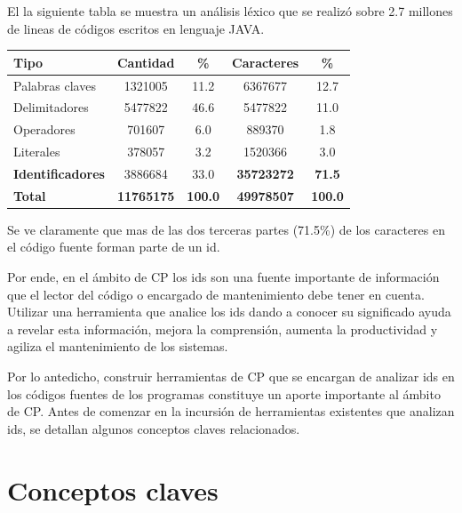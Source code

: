 \documentclass[a4paper,12pt]{report}
\begin{document}

El la siguiente tabla se muestra un análisis léxico que se realizó sobre 2.7 millones de lineas de códigos escritos en lenguaje JAVA.

\begin{center}
   \begin{tabular}{| l | c | c | c | c | }
     \hline
     \textsf{Tipo} & \textsf{Cantidad} & \textsf{\%} & \textsf{Caracteres} & \textsf{\%} \\ \hline
     Palabras claves & 1321005 & 11.2 & 6367677 & 12.7 \\ \hline
     Delimitadores & 5477822 & 46.6 & 5477822 & 11.0 \\ \hline
     Operadores & 701607 & 6.0 & 889370 & 1.8 \\ \hline
     Literales & 378057 & 3.2 & 1520366 & 3.0 \\ \hline          
     \textbf{Identificadores} & 3886684 & 33.0 & \textbf{35723272} & \textbf{71.5} \\ \hline
     \textbf{Total} & \textbf{11765175} & \textbf{100.0} & \textbf{49978507} & \textbf{100.0} \\ \hline          
   \end{tabular}
\end{center}


Se ve claramente que mas de las dos terceras partes (71.5\%) de los caracteres en el código fuente forman parte de un id\cite{DFPM05,DMDJ13}. 

Por ende, en el ámbito de CP los ids son una fuente importante de información que el lector del código o encargado de mantenimiento debe tener en cuenta. Utilizar una herramienta que analice los ids dando a conocer su significado ayuda a revelar esta información, mejora la comprensión, aumenta la productividad y agiliza el mantenimiento de los sistemas.

Por lo antedicho, construir herramientas de CP que se encargan de analizar ids en los códigos fuentes de los programas constituye un aporte importante al ámbito de CP. Antes de comenzar en la incursión de herramientas existentes que analizan ids, se detallan algunos conceptos claves relacionados.

\section{Conceptos claves}
\end{document}
